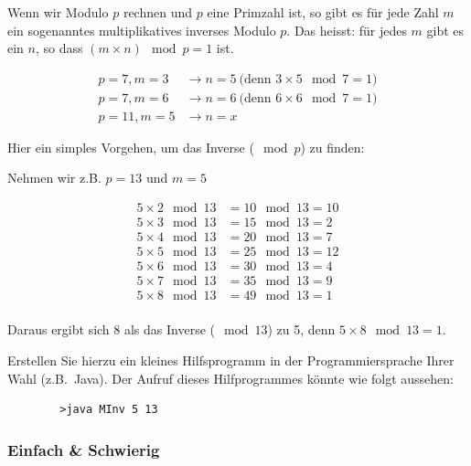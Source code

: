 Wenn wir Modulo $p$ rechnen und $p$ eine Primzahl ist, so gibt es für
jede Zahl $m$ ein sogenanntes multiplikatives inverses Modulo $p$.
Das heisst: für jedes $m$ gibt es ein $n$, so dass $(m\times n) \mod p = 1$ ist.

\begin{align*}
    p = 7, m = 3 &\rightarrow n = 5~ \text{(denn~} 3\times 5\mod 7 = 1 \text{)} \\
    p = 7, m = 6 &\rightarrow n = 6~ \text{(denn~} 6\times 6\mod 7 = 1 \text{)} \\
    p = 11, m = 5 &\rightarrow n = x
\end{align*}

Hier ein simples Vorgehen, um das Inverse ($\mod p$) zu finden:

Nehmen wir z.B. $p = 13$ und $m = 5$

\begin{align*}
    5 \times 2 \mod 13 &= 10 \mod 13 = 10 \\
    5 \times 3 \mod 13 &= 15 \mod 13 = 2  \\
    5 \times 4 \mod 13 &= 20 \mod 13 = 7  \\
    5 \times 5 \mod 13 &= 25 \mod 13 = 12 \\
    5 \times 6 \mod 13 &= 30 \mod 13 = 4  \\
    5 \times 7 \mod 13 &= 35 \mod 13 = 9  \\
    5 \times 8 \mod 13 &= 49 \mod 13 = 1  \\
\end{align*}

Daraus ergibt sich 8 als das Inverse ($\mod 13$) zu 5,
denn $5\times 8 \mod 13 = 1$.

\begin{Exercise}[%
title={Inverse Modulo Berechnung},
label={exercise:inverse-modulo}]

    Erstellen Sie hierzu ein kleines Hilfsprogramm in der Programmiersprache
    Ihrer Wahl (z.B.~Java). Der Aufruf dieses Hilfprogrammes könnte wie folgt aussehen:
    \begin{verbatim}
        >java MInv 5 13
    \end{verbatim}
\end{Exercise}

\subsubsection*{Einfach \& Schwierig}
\label{subsubsec:einfach}

